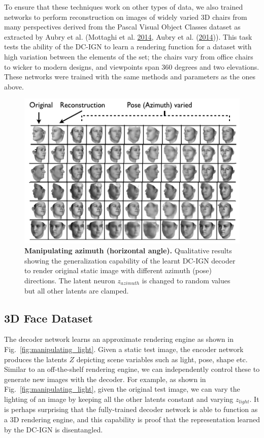 \documentclass[12pt,twoside]{mitthesis}
\begin{document}
To ensure that these techniques work on other types of data, we also
trained networks to perform reconstruction on images of widely varied 3D
chairs from many perspectives derived from the Pascal Visual Object
Classes dataset as extracted by Aubry et al. (Mottaghi et al.
\protect\hyperlink{ref-mottaghi2014role}{2014}, Aubry et al.
(\protect\hyperlink{ref-aubry2014seeing}{2014})). This task tests the
ability of the DC-IGN to learn a rendering function for a dataset with
high variation between the elements of the set; the chairs vary from
office chairs to wicker to modern designs, and viewpoints span 360
degrees and two elevations. These networks were trained with the same
methods and parameters as the ones above.

\begin{figure}[htbp]
\centering
\includegraphics{figures/azvaried.png}
\caption{\label{fig:manipulating_azimuth}\textbf{Manipulating azimuth
(horizontal angle).} Qualitative results showing the generalization
capability of the learnt DC-IGN decoder to render original static image
with different azimuth (pose) directions. The latent neuron
$z_{azimuth}$ is changed to random values but all other latents are
clamped.}
\end{figure}

\subsection{3D Face Dataset}\label{sec:gen}

The decoder network learns an approximate rendering engine as shown in
Fig.~\ref{fig:manipulating_light}. Given a static test image, the
encoder network produces the latents $Z$ depicting scene variables
such as light, pose, shape etc. Similar to an off-the-shelf rendering
engine, we can independently control these to generate new images with
the decoder. For example, as shown in Fig.~\ref{fig:manipulating_light},
given the original test image, we can vary the lighting of an image by
keeping all the other latents constant and varying $z_{light}$. It is
perhaps surprising that the fully-trained decoder network is able to
function as a 3D rendering engine, and this capability is proof that the
representation learned by the DC-IGN is disentangled.
\end{document}

